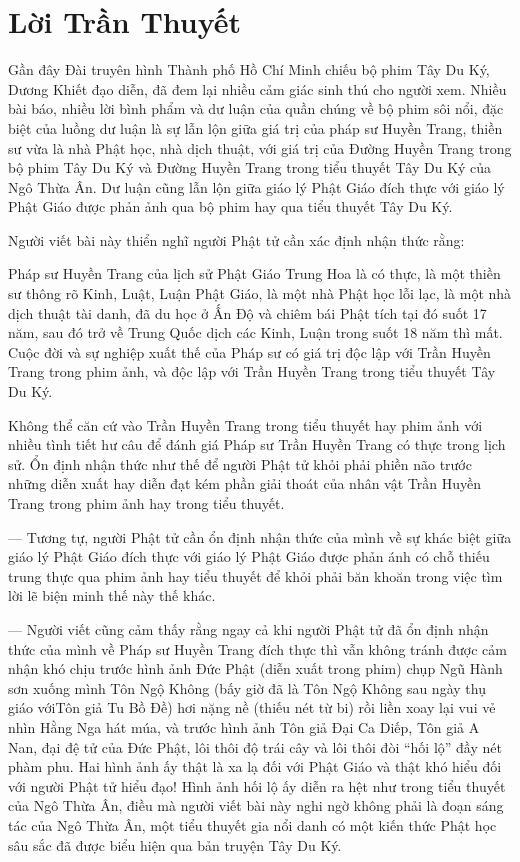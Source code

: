 \chapter{Lời Trần Thuyết} %
\label{cha:loi_tran_thuyet}

Gần đây Đài truyên hình Thành phố Hồ Chí Minh chiếu bộ phim Tây Du Ký, Dương Khiết đạo diễn, đã đem lại nhiều cảm giác sinh thú cho người xem. Nhiều bài báo, nhiều lời bình phẩm và dư luận của quần chúng về bộ phim sôi nổi, đặc biệt của luồng dư luận là sự lẫn lộn giữa giá trị của pháp sư Huyền Trang, thiền sư vừa là nhà Phật học, nhà dịch thuật, với giá trị của Đường Huyền Trang trong bộ phim Tây Du Ký và Đường Huyền Trang trong tiểu thuyết Tây Du Ký của Ngô Thừa Ân. Dư luận cũng lẫn lộn giữa giáo lý Phật Giáo đích thực với giáo lý Phật Giáo được phản ảnh qua bộ phim hay qua tiểu thuyết Tây Du Ký.

Người viết bài này thiển nghĩ người Phật tử cần xác định nhận thức rằng:

Pháp sư Huyền Trang của lịch sử Phật Giáo Trung Hoa là có thực, là một thiền sư thông rõ Kinh, Luật, Luận Phật Giáo, là một nhà Phật học lỗi lạc, là một nhà dịch thuật tài danh, đã du học ở Ấn Độ và chiêm bái Phật tích tại đó suốt 17 năm, sau đó trở về Trung Quốc dịch các Kinh, Luận trong suốt 18 năm thì mất. Cuộc đời và sự nghiệp xuất thế của Pháp sư có giá trị độc lập với Trần Huyền Trang trong phim ảnh, và độc lập với Trần Huyền Trang trong tiểu thuyết Tây Du Ký.

Không thể căn cứ vào Trần Huyền Trang trong tiểu thuyết hay phim ảnh với nhiều tình tiết hư câu để đánh giá Pháp sư Trần Huyền Trang có thực trong lịch sử. Ổn định nhận thức như thế để người Phật tử khỏi phải phiền não trước những diễn xuất hay diễn đạt kém phần giải thoát của nhân vật Trần Huyền Trang trong phim ảnh hay trong tiểu thuyết.

— Tương tự, người Phật tử cần ổn định nhận thức của mình về sự khác biệt giữa giáo lý Phật Giáo đích thực với giáo lý Phật Giáo được phản ánh có chỗ thiếu trung thực qua phim ảnh hay tiểu thuyết để khỏi phải băn khoăn trong việc tìm lời lẽ biện minh thế này thế khác.

— Người viết cũng cảm thấy rằng ngay cả khi người Phật tử đã ổn định nhận thức của mình về Pháp sư Huyền Trang đích thực thì vẫn không tránh được cảm nhận khó chịu trước hình ảnh Đức Phật (diễn xuất trong phim) chụp Ngũ Hành sơn xuống mình Tôn Ngộ Không (bấy giờ đã là Tôn Ngộ Không sau ngày thụ giáo vớiTôn giả Tu Bồ Đề) hơi nặng nề (thiếu nét từ bi) rồi liền xoay lại vui vẻ nhìn Hằng Nga hát múa, và trước hình ảnh Tôn giả Đại Ca Diếp, Tôn giả A Nan, đại đệ tử của Đức Phật, lôi thôi độ trái cây và lôi thôi đòi ``hối lộ'' đầy nét phàm phu. Hai hình ảnh ấy thật là xa lạ đối với Phật Giáo và thật khó hiểu đối với người Phật tử hiểu đạo! Hình ảnh hối lộ ấy diễn ra hệt như trong tiểu thuyết của Ngô Thừa Ân, điều mà người viết bài này nghi ngờ không phải là đoạn sáng tác của Ngô Thừa Ân, một tiểu thuyết gia nổi danh có một kiến thức Phật học sâu sắc đã được biểu hiện qua bản truyện Tây Du Ký.

